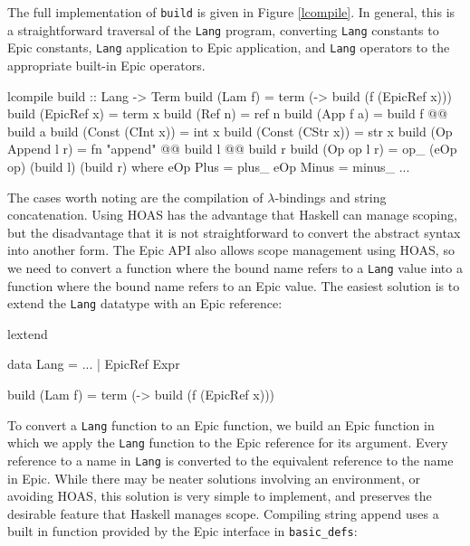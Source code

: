 \noindent
The full implementation of \texttt{build} is given in Figure \ref{lcompile}.
In general, this is a straightforward traversal of the \texttt{Lang}
program, converting \texttt{Lang} constants to Epic constants,
\texttt{Lang} application to Epic application, and \texttt{Lang}
operators to the appropriate built-in Epic operators. 
                  
\begin{SaveVerbatim}{lcompile}
build :: Lang -> Term
build (Lam f)          = term (\x -> build (f (EpicRef x)))
build (EpicRef x)      = term x
build (Ref n)          = ref n
build (App f a)        = build f @@ build a
build (Const (CInt x)) = int x
build (Const (CStr x)) = str x
build (Op Append l r)  = fn "append" @@ build l @@ build r
build (Op op l r)      = op_ (eOp op) (build l) (build r)
    where eOp Plus   = plus_
          eOp Minus  = minus_
          ...
\end{SaveVerbatim}

The cases worth noting are the compilation of $\lambda$-bindings and
string concatenation. Using HOAS has the advantage that Haskell can
manage scoping, but the disadvantage that it is not straightforward to
convert the abstract syntax into another form. The Epic API also
allows scope management using HOAS, so we need to convert a function
where the bound name refers to a \texttt{Lang} value into a function
where the bound name refers to an Epic value. The easiest solution is
to extend the \texttt{Lang} datatype with an Epic reference:

\begin{SaveVerbatim}{lextend}

data Lang = ...
          | EpicRef Expr

build (Lam f) = term (\x -> build (f (EpicRef x)))

\end{SaveVerbatim}

\noindent
To convert a \texttt{Lang} function to an Epic function, we build an
Epic function in which we apply the \texttt{Lang} function to the Epic
reference for its argument. Every reference to a name in \texttt{Lang}
is converted to the equivalent reference to the name in Epic. While
there may be neater solutions involving an environment, or avoiding
HOAS, this solution is very simple to implement, and preserves the
desirable feature that Haskell manages scope.
Compiling string append uses a built in function provided by the Epic
interface in \texttt{basic\_defs}:

